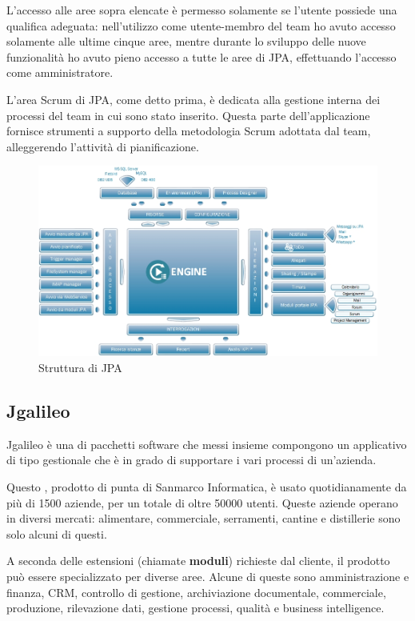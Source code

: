L'accesso alle aree sopra elencate è permesso solamente se l'utente possiede
una qualifica adeguata: nell'utilizzo come utente-membro del team ho
avuto accesso solamente alle ultime cinque aree, mentre durante lo sviluppo
delle nuove funzionalità ho avuto pieno accesso a tutte le aree di JPA,
effettuando l'accesso come amministratore.

L'area Scrum di JPA, come detto prima, è dedicata alla gestione interna dei
processi del team in cui sono stato inserito. Questa parte dell'applicazione
fornisce strumenti a supporto della metodologia Scrum adottata dal team,
alleggerendo l'attività di pianificazione.

\begin{figure}[H]%
\centering
\includegraphics[width=1.25\columnwidth]{immagini/jpa-strutt}%
\caption{Struttura di JPA}%
\label{fig:strutt-jpa}%
\end{figure}
\subsection{Jgalileo}
Jgalileo è una  di pacchetti software che messi insieme compongono
un applicativo di tipo gestionale che è in grado di supportare i vari processi
di un'azienda.

Questo , prodotto di punta di Sanmarco Informatica, è usato
quotidianamente da più di 1500 aziende, per un totale di oltre 50000 utenti.
Queste aziende operano in diversi mercati: alimentare, commerciale, serramenti,
cantine e distillerie sono solo alcuni di questi.

A seconda delle estensioni (chiamate \textbf{moduli}) richieste dal cliente,
il prodotto può essere specializzato per diverse aree. Alcune di queste sono
amministrazione e finanza, CRM, controllo di gestione, archiviazione
documentale, commerciale, produzione, rilevazione dati, gestione processi,
qualità e business intelligence.

